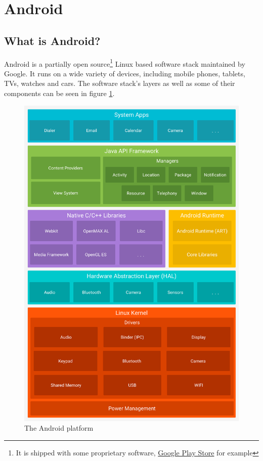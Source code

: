 \graphicspath{{./lab00/Images/}}

\maketocpage

\section{Android}
\subsection{What is Android?}
Android is a partially open source\footnote{It is shipped with some proprietary software, \href{https://play.google.com/store?hl=en}{Google Play Store} for example} Linux based software stack maintained by Google. It runs on a wide variety of devices, including mobile phones, tablets, TVs, watches and cars. The software stack's layers as well as some of their components can be seen in figure \ref{fig:droidarc}.

\begin{figure}[H]
\centering
\includegraphics[scale=.3]{android_architecture_detailed.png}
\caption{The Android platform}
\label{fig:droidarc}
\end{figure}


